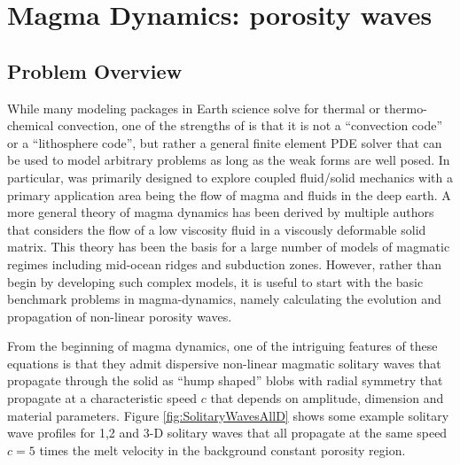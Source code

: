 \chapter{Magma Dynamics: porosity waves}
\label{cha:porosity-waves}

\section{Problem Overview}
\label{sec:porosity_waves-formulation}


While many modeling packages in Earth science solve for thermal or
thermo-chemical convection, one of the strengths of \TF{} is that it
is not a ``convection code'' or a ``lithosphere code'', but rather a
general finite element PDE solver that can be used to model arbitrary
problems as long as the weak forms are well posed.  In particular,
\TF{} was primarily designed to explore coupled fluid/solid mechanics
with a primary application area being the flow of magma and fluids in
the deep earth.  A more general theory of magma dynamics has been
derived by multiple authors
\cite{mckenzie_generation_1984,scott_magma_1984,scott_magma_1986,spiegelman_flow_1993,spiegelman_flow_1993-1,bercovici_two-phase_2001-1,bercovici_energetics_2003,simpson_multiscale_2010,simpson_multiscale_2010-1}
that considers the flow of a low viscosity fluid in a viscously
deformable solid matrix. This theory has been the basis for a large
number of models of magmatic regimes including mid-ocean ridges and
subduction zones.  However, rather than begin by developing such 
complex models,  it is useful to start with the basic benchmark
problems in magma-dynamics, namely calculating the evolution and
propagation of non-linear porosity waves.

From the beginning of magma dynamics, one of
the intriguing features of these equations is that they admit dispersive
non-linear magmatic solitary waves that propagate through the solid as
``hump shaped'' blobs with radial symmetry that propagate at a
characteristic speed $c$ that depends on amplitude, dimension and
material parameters.  Figure \ref{fig:SolitaryWavesAllD} shows some
example solitary wave profiles for 1,2 and 3-D solitary waves that all
propagate at the same speed $c=5$ times the melt velocity in the
background constant porosity region.

